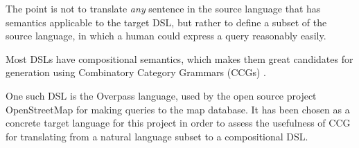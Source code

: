 \documentclass[main.tex]{subfiles}
\begin{document}
The point is not to translate \emph{any} sentence in the source language
that has semantics applicable to the target DSL, but rather to define a
subset of the source language, in which a human could express a query
reasonably easily.

Most DSLs have compositional semantics, which makes them great candidates
for generation using Combinatory Category Grammars (CCGs) \cite[p.~181]{nts}.

One such DSL is the Overpass language, used by the open source project
OpenStreetMap for making queries to the map database. It has been chosen as
a concrete target language for this project in order to assess the usefulness
of CCG for translating from a natural language subset to a compositional
DSL.
\end{document}
